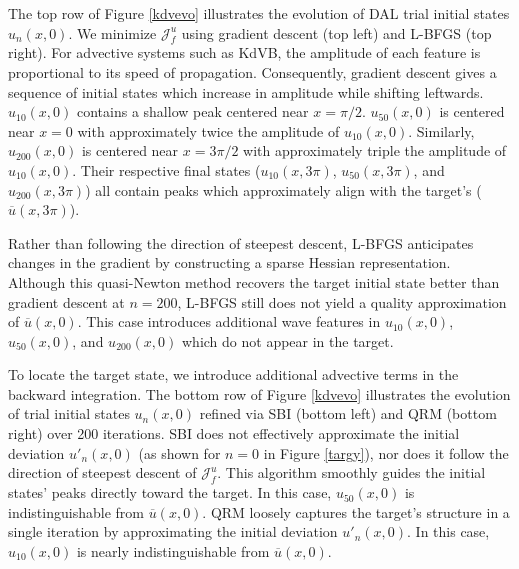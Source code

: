 \documentclass[%
 reprint,
 amsmath,amssymb,
 aps,
 pre,
]{revtex4-2}
\newcommand{\Juf}{\mathcal{J}^{u}_f}
\begin{document}
The top row of Figure \ref{kdvevo} illustrates the evolution of DAL trial initial states $u_n(x,0)$.
We minimize $\Juf$ using gradient descent (top left) and L-BFGS (top right).
For advective systems such as KdVB, the amplitude of each feature is proportional to its speed of propagation.
Consequently, gradient descent gives a sequence of initial states which increase in amplitude while shifting leftwards.
$u_{10}(x,0)$ contains a shallow peak centered near $x=\pi/2$.
$u_{50}(x,0)$ is centered near $x=0$ with approximately twice the amplitude of $u_{10}(x,0)$.
Similarly, $u_{200}(x,0)$ is centered near $x=3\pi/2$ with approximately triple the amplitude of $u_{10}(x,0)$.
Their respective final states ($u_{10}(x,3\pi)$, $u_{50}(x,3\pi)$, and $u_{200}(x,3\pi)$) all contain peaks which approximately align with the target's ($\overline{u}(x,3\pi)$).

Rather than following the direction of steepest descent, L-BFGS anticipates changes in the gradient by constructing a sparse Hessian representation.
Although this quasi-Newton method recovers the target initial state better than gradient descent at $n=200$, L-BFGS still does not yield a quality approximation of $\overline{u}(x,0)$.
This case introduces additional wave features in $u_{10}(x,0)$, $u_{50}(x,0)$, and $u_{200}(x,0)$ which do not appear in the target.

To locate the target state, we introduce additional advective terms in the backward integration.
The bottom row of Figure \ref{kdvevo} illustrates the evolution of trial initial states $u_n(x,0)$ refined via SBI (bottom left) and QRM (bottom right) over 200 iterations.
SBI does not effectively approximate the initial deviation $u'_n(x,0)$ (as shown for $n=0$ in Figure \ref{targy}), nor does it follow the direction of steepest descent of $\Juf$.
This algorithm smoothly guides the initial states' peaks directly toward the target.
In this case, $u_{50}(x,0)$ is indistinguishable from $\overline{u}(x,0)$.
QRM loosely captures the target's structure in a single iteration by approximating the initial deviation $u'_n(x,0)$.
In this case, $u_{10}(x,0)$ is nearly indistinguishable from $\overline{u}(x,0)$.
\end{document}
